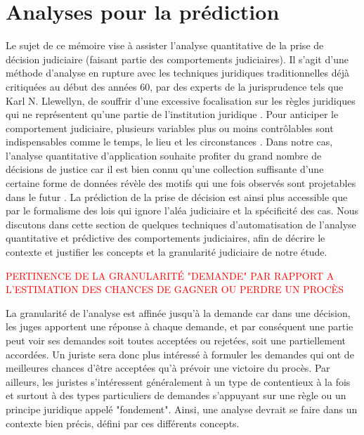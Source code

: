\section{Analyses pour la prédiction}
\label{sec:literature:legalpredict}
Le sujet de ce mémoire vise à assister l'analyse quantitative de la prise de décision judiciaire (faisant partie des comportements judiciaires). Il s'agit d'une méthode d'analyse en rupture avec les techniques juridiques traditionnelles déjà critiquées au début des années 60, par des experts de la jurisprudence tels que Karl N. Llewellyn, de souffrir d'une excessive focalisation sur les règles juridiques qui ne représentent qu'une partie de l'institution juridique \citep{llewellyn1962jurisprudence}. Pour anticiper le comportement judiciaire, plusieurs variables plus ou moins contrôlables sont indispensables comme le temps, le lieu et les circonstances \citep{ulmer1963quantitative}. Dans notre cas, l'analyse quantitative d'application souhaite profiter du grand nombre de décisions de justice car il est bien connu qu'une collection suffisante d'une certaine forme de données révèle des motifs qui une fois observés sont projetables dans le futur \citep{ulmer1963quantitative}. La prédiction de la prise de décision est ainsi plus accessible que par le formalisme des lois qui ignore l'aléa judiciaire et la spécificité des cas.  Nous discutons dans cette section de quelques techniques d'automatisation de l'analyse quantitative et prédictive des comportements judiciaires, afin de décrire le contexte et justifier les concepts et la granularité judiciaire de notre étude.

\textcolor{red}{PERTINENCE DE LA GRANULARITÉ "DEMANDE" PAR RAPPORT A L'ESTIMATION DES CHANCES DE GAGNER OU PERDRE UN PROCÈS}

La granularité de l'analyse est affinée jusqu'à la demande car dans une décision, les juges apportent une réponse à chaque demande, et par conséquent une partie peut voir ses demandes soit toutes acceptées ou rejetées, soit une partiellement accordées. Un juriste sera donc plus intéressé à formuler les demandes qui ont de meilleures chances d'être acceptées qu'à prévoir une victoire du procès. Par ailleurs, les juristes s'intéressent généralement à un type de contentieux à la fois et surtout à des types particuliers de demandes s'appuyant sur une règle ou un principe juridique appelé "fondement". Ainsi, une analyse devrait se faire dans un contexte bien précis, défini par ces différents concepts.

